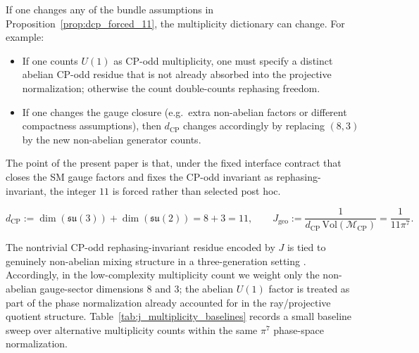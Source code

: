 \begin{remark}\label{rem:dcp_failure_modes}
If one changes any of the bundle assumptions in Proposition~\ref{prop:dcp_forced_11}, the multiplicity dictionary can change.
For example:
\begin{itemize}
\item If one counts $U(1)$ as CP-odd multiplicity, one must specify a distinct abelian CP-odd residue that is not already absorbed into the projective normalization; otherwise the count double-counts rephasing freedom.
\item If one changes the gauge closure (e.g.\ extra non-abelian factors or different compactness assumptions), then $d_{\mathrm{CP}}$ changes accordingly by replacing $(8,3)$ by the new non-abelian generator counts.
\end{itemize}
The point of the present paper is that, under the fixed interface contract that closes the SM gauge factors and fixes the CP-odd invariant as rephasing-invariant, the integer $11$ is forced rather than selected post hoc.
\end{remark}
\begin{equation}\label{eq:j_geo}
d_{\mathrm{CP}}:=\dim(\mathfrak{su}(3))+\dim(\mathfrak{su}(2))=8+3=11,
\qquad
J_{\mathrm{geo}}:=\frac{1}{d_{\mathrm{CP}}\,\mathrm{Vol}(\mathcal{M}_{\mathrm{CP}})}=\frac{1}{11\pi^7}.
\end{equation}

\begin{remark}\label{rem:dcp_excludes_u1}
The nontrivial CP-odd rephasing-invariant residue encoded by $J$ is tied to genuinely non-abelian mixing structure in a three-generation setting \cite{Jarlskog1985,PDGRPP2024}.
Accordingly, in the low-complexity multiplicity count we weight only the non-abelian gauge-sector dimensions $8$ and $3$; the abelian $U(1)$ factor is treated as part of the phase normalization already accounted for in the ray/projective quotient structure.
Table~\ref{tab:j_multiplicity_baselines} records a small baseline sweep over alternative multiplicity counts within the same $\pi^7$ phase-space normalization.
\end{remark}

